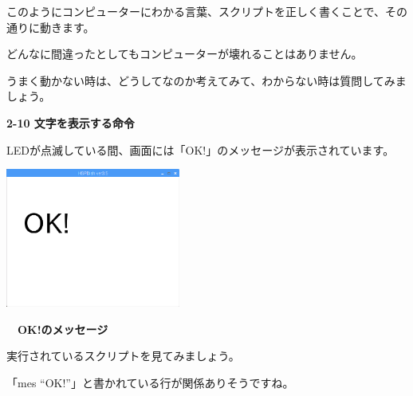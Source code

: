 \documentclass[a4paper,dvipdfmx]{jarticle}
\begin{document}
\bigskip


\bigskip


\bigskip


\bigskip


\bigskip


\bigskip

このようにコンピューターにわかる言葉、スクリプトを正しく書くことで、その通りに動きます。

どんなに間違ったとしてもコンピューターが壊れることはありません。

うまく動かない時は、どうしてなのか考えてみて、わからない時は質問してみましょう。


\bigskip

{\bfseries
2-10 文字を表示する命令}


\bigskip

LEDが点滅している間、画面には「OK!」のメッセージが表示されています。


\bigskip



\begin{center}
\includegraphics[width=5.741cm,height=4.572cm]{text02-img/text02-img027.png}

\end{center}

\bigskip


\bigskip


\bigskip


\bigskip


\bigskip


\bigskip


\bigskip


\bigskip

{\bfseries
　OK!のメッセージ}


\bigskip


\bigskip


\bigskip

実行されているスクリプトを見てみましょう。

「mes
“OK!”」と書かれている行が関係ありそうですね。
\end{document}
